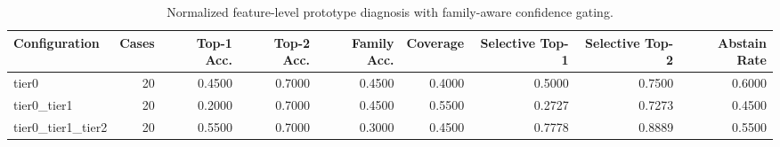 \begin{table}[t]
\centering
\caption{Normalized feature-level prototype diagnosis with family-aware confidence gating.}
\label{tab:dice_stressor_hierarchical_diagnosis}
\footnotesize
\begin{tabular}{lrrrrrrrr}
\toprule
Configuration & Cases & Top-1 Acc. & Top-2 Acc. & Family Acc. & Coverage & Selective Top-1 & Selective Top-2 & Abstain Rate \\
\midrule
tier0 & 20 & 0.4500 & 0.7000 & 0.4500 & 0.4000 & 0.5000 & 0.7500 & 0.6000 \\
tier0_tier1 & 20 & 0.2000 & 0.7000 & 0.4500 & 0.5500 & 0.2727 & 0.7273 & 0.4500 \\
tier0_tier1_tier2 & 20 & 0.5500 & 0.7000 & 0.3000 & 0.4500 & 0.7778 & 0.8889 & 0.5500 \\
\bottomrule
\end{tabular}

\end{table}
